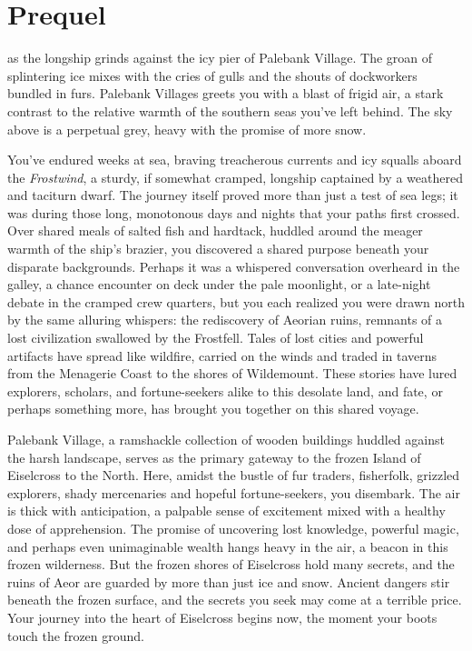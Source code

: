 \documentclass[
  letterpaper,12pt,twoside,twocolumn,openany,
  nodeprecatedcode,bg=full]{dndbook}
\author{}
\date{}
\begin{document}
\chapter{Prequel}\label{prequel}

 as the longship
grinds against the icy pier of Palebank Village. The groan of
splintering ice mixes with the cries of gulls and the shouts of
dockworkers bundled in furs. Palebank Villages greets you with a blast
of frigid air, a stark contrast to the relative warmth of the southern
seas you've left behind. The sky above is a perpetual grey, heavy with
the promise of more snow.

You've endured weeks at sea, braving treacherous currents and icy
squalls aboard the \emph{Frostwind}, a sturdy, if somewhat cramped,
longship captained by a weathered and taciturn dwarf. The journey itself
proved more than just a test of sea legs; it was during those long,
monotonous days and nights that your paths first crossed. Over shared
meals of salted fish and hardtack, huddled around the meager warmth of
the ship's brazier, you discovered a shared purpose beneath your
disparate backgrounds. Perhaps it was a whispered conversation overheard
in the galley, a chance encounter on deck under the pale moonlight, or a
late-night debate in the cramped crew quarters, but you each realized
you were drawn north by the same alluring whispers: the rediscovery of
Aeorian ruins, remnants of a lost civilization swallowed by the
Frostfell. Tales of lost cities and powerful artifacts have spread like
wildfire, carried on the winds and traded in taverns from the Menagerie
Coast to the shores of Wildemount. These stories have lured explorers,
scholars, and fortune-seekers alike to this desolate land, and fate, or
perhaps something more, has brought you together on this shared voyage.

Palebank Village, a ramshackle collection of wooden buildings huddled
against the harsh landscape, serves as the primary gateway to the frozen
Island of Eiselcross to the North. Here, amidst the bustle of fur
traders, fisherfolk, grizzled explorers, shady mercenaries and hopeful
fortune-seekers, you disembark. The air is thick with anticipation, a
palpable sense of excitement mixed with a healthy dose of apprehension.
The promise of uncovering lost knowledge, powerful magic, and perhaps
even unimaginable wealth hangs heavy in the air, a beacon in this frozen
wilderness. But the frozen shores of Eiselcross hold many secrets, and
the ruins of Aeor are guarded by more than just ice and snow. Ancient
dangers stir beneath the frozen surface, and the secrets you seek may
come at a terrible price. Your journey into the heart of Eiselcross
begins now, the moment your boots touch the frozen ground.
\end{document}
